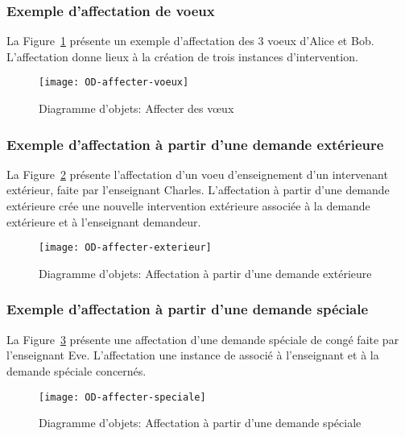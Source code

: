 \subsubsection{Exemple d'affectation de voeux}
La Figure~\ref{fig:affectation} présente un exemple d'affectation des 3 voeux d'Alice et Bob.
L'affectation donne lieux à la création de trois instances d'intervention.

\begin{figure}[!htbp]
\begin{center}
\texttt{[image: OD-affecter-voeux]}
\caption{Diagramme d'objets: Affecter des vœux}\label{fig:affectation}
\end{center}
\end{figure}

\subsubsection{Exemple d'affectation à partir d'une demande extérieure}
La Figure~\ref{fig:affectation:ext} présente l'affectation d'un voeu d'enseignement d'un intervenant extérieur, faite par l'enseignant Charles.
L'affectation à partir d'une demande extérieure crée une nouvelle intervention extérieure associée à la demande extérieure et à l'enseignant demandeur.

\begin{figure}[!htbp]
\begin{center}
\texttt{[image: OD-affecter-exterieur]}
\caption{Diagramme d'objets: Affectation à partir d'une demande extérieure}
\label{fig:affectation:ext}
\end{center}
\end{figure}


\subsubsection{Exemple d'affectation à partir d'une demande spéciale}
La Figure~\ref{fig:affectation:spe} présente une affectation d'une demande spéciale de congé faite par l'enseignant Eve.
L'affectation une instance de   associé à l'enseignant et à la demande spéciale concernés.

 \begin{figure}[!htbp]
 \begin{center}
 \texttt{[image: OD-affecter-speciale]}
 \caption{Diagramme d'objets: Affectation à partir d'une demande spéciale}
 \label{fig:affectation:spe}
 \end{center}
 \end{figure}

